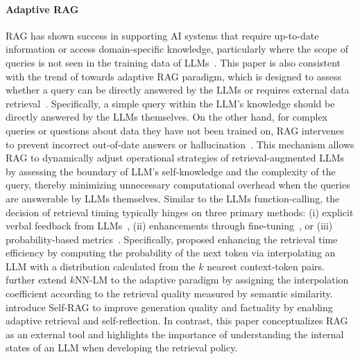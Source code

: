 \paragraph{Adaptive RAG}
RAG has shown success in supporting AI systems that require up-to-date information or access domain-specific knowledge, particularly where the scope of queries is not seen in the training data of LLMs~\citep{lewis2020retrieval, ren2023investigating,vu2023freshllms,izacard2023atlas}. This paper is also consistent with the trend of towards adaptive RAG paradigm, which is designed to assess whether a query can be directly answered by the LLMs or requires external data retrieval~\citep{asai2023self, jiang2023active}. Specifically, a simple query within the LLM's knowledge should be directly answered by the LLMs themselves. On the other hand, for complex queries or questions about data they have not been trained on, RAG intervenes to prevent incorrect out-of-date answers or hallucination~\citep {JiSurvey}. This mechanism allows RAG to dynamically adjust operational strategies of retrieval-augmented LLMs by assessing the boundary of LLM's self-knowledge and the complexity of the query, thereby minimizing unnecessary computational overhead when the queries are answerable by LLMs themselves. 
Similar to the LLMs function-calling, the decision of retrieval timing typically hinges on three primary methods: (i) explicit verbal feedback from LLMs~\citep{ding2024retrieve}, (ii) enhancements through fine-tuning~\citep{asai2023self}, or (iii) probability-based metrics~\citep{kadavath2022language,jiang2023active}. Specifically, \cite{he2021efficient} proposed enhancing the retrieval time efficiency by computing the probability of the next token via interpolating an LLM with a distribution calculated from the $k$ nearest context-token pairs. \cite{drozdov2022you} further extend $k$NN-LM to the adaptive paradigm by assigning the interpolation coefficient according to the retrieval quality measured by semantic similarity. \cite{asai2023self} introduce Self-RAG to improve generation quality and factuality by enabling adaptive retrieval and self-reflection. In contrast, this paper conceptualizes RAG as an external tool and highlights the importance of understanding the internal states of an LLM when developing the retrieval policy. 

